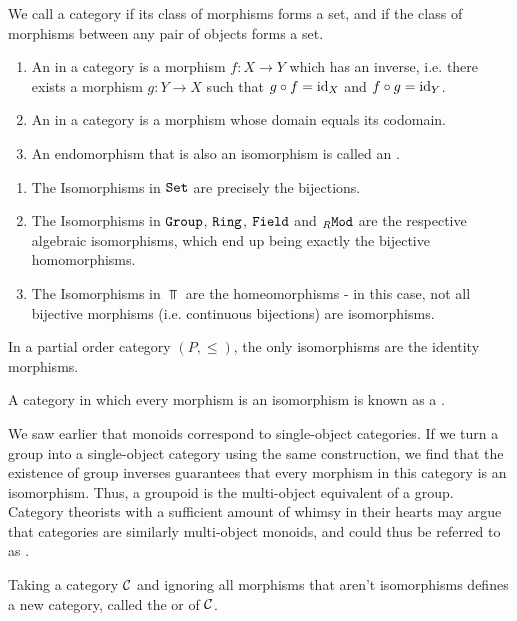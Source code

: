 \begin{definition}
	We call a category  if its class of morphisms forms a set, and  if the class of morphisms between any pair of objects forms a set.
\end{definition}
\begin{importantdefinition}{}{}
	\begin{enumerate}
		\item An  in a category is a morphism $f : X \to Y$ which has an inverse, i.e. there exists a morphism $g : Y \to X$ such that $g \circ f = \operatorname{id}_X$ and $f \circ g = \operatorname{id}_Y$.
		\item An  in a category is a morphism whose domain equals its codomain.
		\item An endomorphism that is also an isomorphism is called an .
	\end{enumerate}
\end{importantdefinition}
\begin{proposition}
	\phantom{}
	\begin{enumerate}
		\item The Isomorphisms in $\texttt{Set}$ are precisely the bijections.
		\item The Isomorphisms in $\texttt{Group}$, $\texttt{Ring}$, $\texttt{Field}$ and $_R \texttt{Mod}$ are the respective algebraic isomorphisms, which end up being exactly the bijective homomorphisms.
		\item The Isomorphisms in $\Top$ are the homeomorphisms - in this case, not all bijective morphisms (i.e. continuous bijections) are isomorphisms.
	\end{enumerate}
\end{proposition}
\begin{exercise}
	In a partial order category $(P, \leq)$, the only isomorphisms are the identity morphisms.
\end{exercise}
\begin{definition}
	A category in which every morphism is an isomorphism is known as a .
\end{definition}
We saw earlier that monoids correspond to single-object categories. If we turn a group into a single-object category using the same construction, we find that the existence of group inverses guarantees that every morphism in this category is an isomorphism. Thus, a groupoid is the multi-object equivalent of a group. Category theorists with a sufficient amount of whimsy in their hearts may argue that categories are similarly multi-object monoids, and could thus be referred to as .
\begin{proposition}
	Taking a category $\mathcal{C}$ and ignoring all morphisms that aren't isomorphisms defines a new category, called the  or  of $\mathcal{C}$.
\end{proposition}
